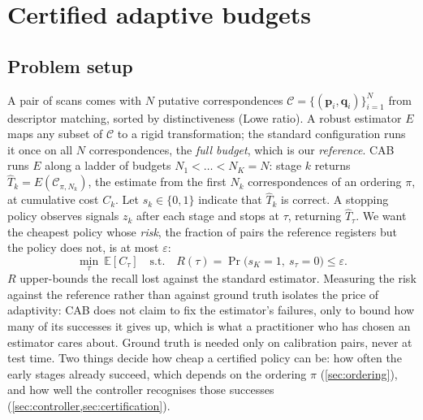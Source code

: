 \documentclass[10pt,twocolumn,letterpaper]{article}
\newcommand{\method}{CAB\xspace}
\begin{document}
\section{Certified adaptive budgets}
\label{sec:method}

\subsection{Problem setup}
\label{sec:setup}
A pair of scans comes with $N$ putative correspondences $\mathcal C=\{(\mathbf p_i,\mathbf q_i)\}_{i=1}^{N}$ from descriptor matching, sorted by distinctiveness (Lowe ratio).
A robust estimator $E$ maps any subset of $\mathcal C$ to a rigid transformation; the standard configuration runs it once on all $N$ correspondences, the \emph{full budget}, which is our \emph{reference}.
\method runs $E$ along a ladder of budgets $N_1<\dots<N_K=N$: stage $k$ returns $\hat T_k=E(\mathcal C_{\pi,N_k})$, the estimate from the first $N_k$ correspondences of an ordering $\pi$, at cumulative cost $C_k$.
Let $s_k\in\{0,1\}$ indicate that $\hat T_k$ is correct.
A stopping policy observes signals $z_k$ after each stage and stops at $\tau$, returning $\hat T_\tau$.
We want the cheapest policy whose \emph{risk}, the fraction of pairs the reference registers but the policy does not, is at most $\varepsilon$:
\begin{equation}
\label{eq:objective}
\min_{\tau}\ \mathbb E[C_\tau]\quad\text{s.t.}\quad R(\tau)=\Pr\big(s_K=1,\ s_\tau=0\big)\le\varepsilon .
\end{equation}
$R$ upper-bounds the recall lost against the standard estimator.
Measuring the risk against the reference rather than against ground truth isolates the price of adaptivity: \method does not claim to fix the estimator's failures, only to bound how many of its successes it gives up, which is what a practitioner who has chosen an estimator cares about.
Ground truth is needed only on calibration pairs, never at test time.
Two things decide how cheap a certified policy can be: how often the early stages already succeed, which depends on the ordering $\pi$ (\cref{sec:ordering}), and how well the controller recognises those successes (\cref{sec:controller,sec:certification}).
\end{document}
